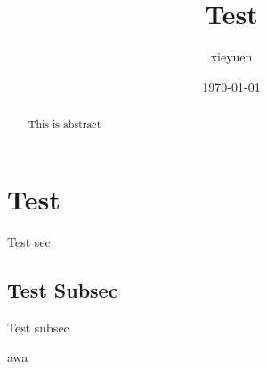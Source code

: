 \documentclass[citestyle=gb7714-2015, bibstyle=gb7714-2015]{elegantpaper}
\title{Test}
\author{xieyuen}
\date{\today}
\begin{document}
    \maketitle
    \begin{abstract}
        This is abstract\cite{test}
    \end{abstract}

    \newpage
    \tableofcontents
    \newpage

    \section{Test}\label{sec:test}
    Test sec
    \subsection{Test Subsec}\label{subsec:test_subsec}
    Test subsec

    \newpage
    \nocite{*}
    \printbibliography[heading=bibintoc, title=\ebibname]

    \newpage
    \appendix
    \appendixpage

    awa

    \addappheadtotoc
\end{document}
